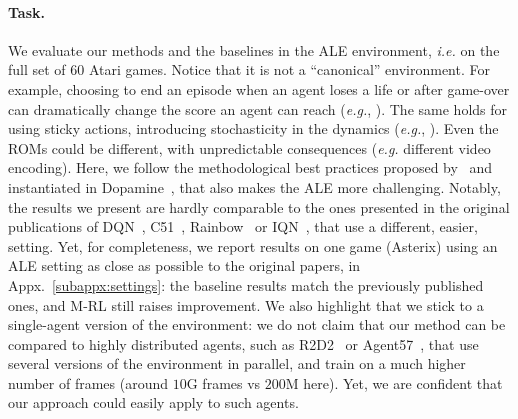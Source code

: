 \documentclass{article}
\begin{document}
\paragraph{Task.} 
We evaluate our methods and the baselines in the ALE environment, \textit{i.e.} on the full set of $60$ Atari games.
Notice that it is not a ``canonical'' environment. For example, choosing to end an episode when an agent loses a life or after game-over can dramatically change the score an agent can reach (\textit{e.g.}, \cite[Fig.~4]{castro2018dopamine}). The same holds for using sticky actions, introducing stochasticity in the dynamics (\textit{e.g.}, \cite[Fig.~6]{castro2018dopamine}). Even the ROMs could be different, with unpredictable consequences (\textit{e.g.} different video encoding). Here, we follow the methodological best practices proposed by~\citet{machado2018revisiting} and instantiated in Dopamine~\cite{castro2018dopamine}, that also makes the ALE more challenging. Notably, the results we present are hardly comparable to the ones presented in the original publications of DQN~\cite{mnih2015human}, C51~\cite{bellemare2017distributional}, Rainbow~\cite{hessel2018rainbow} or IQN~\cite{dabney2018implicit}, that use a different, easier, setting. Yet, for completeness, we report results on one game (Asterix) using an ALE setting as close as possible to the original papers, in Appx.~\ref{subappx:settings}: the baseline results match the previously published ones, and M-RL still raises improvement. We also highlight that we stick to a single-agent version of the environment: we do not claim that our method can be compared to highly distributed agents, such as R2D2~\citep{kapturowski2018recurrent} or Agent57~\citep{badia2020agent57}, that use several versions of the environment in parallel, and train on a much higher number of frames (around $10$G frames vs $200$M here). Yet, we are confident that our approach could easily apply to such agents.
\end{document}
